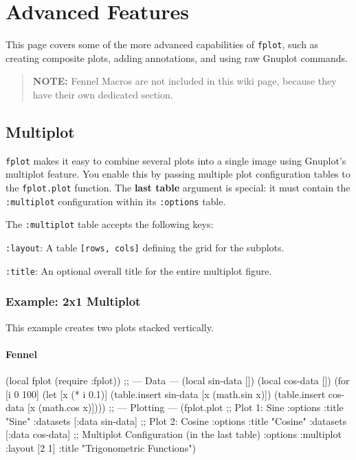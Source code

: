 \documentclass[12pt, letterpaper]{article}
\begin{document}
	\newpage
	
	\section{Advanced Features}
	
	This page covers some of the more advanced capabilities of \texttt{fplot}, such as creating composite plots, adding annotations, and using raw Gnuplot commands.
	
	\begin{quote}
		\textbf{NOTE:} Fennel Macros are not included in this wiki page, because they have their own dedicated section.
	\end{quote}
	
	\subsection{Multiplot}
	
	\texttt{fplot} makes it easy to combine several plots into a single image using Gnuplot's multiplot feature. You enable this by passing multiple plot configuration tables to the \texttt{fplot.plot} function. The \textbf{last table} argument is special: it must contain the \texttt{:multiplot} configuration within its \texttt{:options} table.
	
	The \texttt{:multiplot} table accepts the following keys:
	
	\texttt{:layout}: A table \texttt{[rows, cols]} defining the grid for the subplots.
	
	\texttt{:title}: An optional overall title for the entire multiplot figure.
	
	\subsubsection*{Example: 2x1 Multiplot}
	
	This example creates two plots stacked vertically.
	
	\paragraph{Fennel}
	
	\begin{fennelcode}
(local fplot (require :fplot))
;; --- Data ---
(local sin-data [])
(local cos-data [])
(for [i 0 100]
(let [x (* i 0.1)]
(table.insert sin-data [x (math.sin x)])
(table.insert cos-data [x (math.cos x)])))
;; --- Plotting ---
(fplot.plot
;; Plot 1: Sine
{:options {:title "Sine"}
	:datasets [{:data sin-data}]}
;; Plot 2: Cosine
{:options {:title "Cosine"}
	:datasets [{:data cos-data}]}
;; Multiplot Configuration (in the last table)
{:options {:multiplot {:layout [2 1]
			:title "Trigonometric Functions"}}})
	\end{fennelcode}
	
\end{document}
